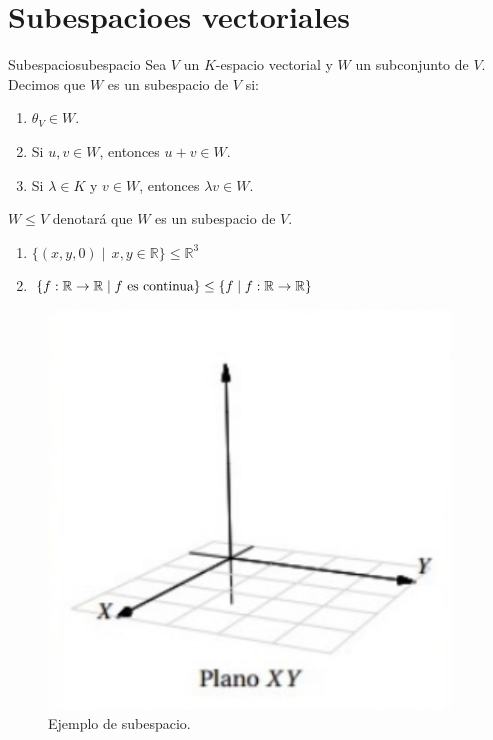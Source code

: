 \section{Subespacioes vectoriales}
\begin{definition}{Subespacio}{subespacio} 
    Sea $V$ un $K$-espacio vectorial y $W$ un subconjunto de $V$. Decimos que $W$ es un subespacio de $V$ si:
    \begin{enumerate}[label=\alph*)]
        \item $\theta_V \in W$. \label{subespacio-p1}
        \item Si $u,v\in W$, entonces $u+v\in W$. \label{subespacio-p2}
        \item Si $\lambda \in K$ y $v\in W$, entonces $\lambda v \in W$. \label{subespacio-p3}
    \end{enumerate}
\end{definition}
\begin{notation}{}{}
    $W \leq V$ denotará que $W$ es un subespacio de $V$.
\end{notation}

\begin{example}{}{}
    \begin{enumerate}
        \item $\{(x,y,0) \mid \, x,y \in \mathbb{R}\} \leq \mathbb{R}^3 $ 
        \item $\{f: \mathbb{R} \rightarrow \mathbb{R} \mid f \text{ es continua}\} \leq \{f \mid f: \mathbb{R} \rightarrow \mathbb{R}\}$
    \end{enumerate}    
\end{example}

\begin{figure}[h]
    \centering
    \includegraphics[scale=0.35]{src/Unidad1/img/ev1-2-1.png}
    \caption{Ejemplo de subespacio.}
    \label{fig:espacios-vectoriales2}
\end{figure}

